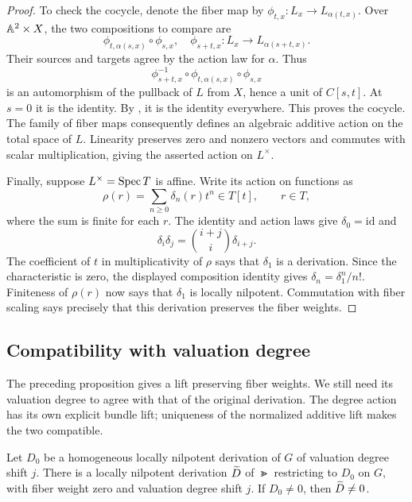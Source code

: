\begin{proof}
To check the cocycle, denote the fiber map by
$\phi_{t,x}\colon L_x\to L_{\alpha(t,x)}$.
Over $\mathbb A^2\times X$, the two compositions to compare are
\[
 \phi_{t,\alpha(s,x)}\circ\phi_{s,x},\quad
 \phi_{s+t,x}
 \colon L_x\longrightarrow L_{\alpha(s+t,x)}.
\]
Their sources and targets agree by the action law for $\alpha$.
Thus
\[
 \phi_{s+t,x}^{-1}\circ
 \phi_{t,\alpha(s,x)}\circ\phi_{s,x}
\]
is an automorphism of the pullback of $L$ from $X$, hence a unit
of $C[s,t]$. At $s=0$ it is the identity. By
, it is the identity everywhere.
This proves the cocycle. The family of fiber maps consequently
defines an algebraic additive action on the total space of $L$.
Linearity preserves zero and nonzero vectors and commutes with
scalar multiplication, giving the asserted action on $L^\times$.

Finally, suppose $L^\times=\operatorname{Spec} T$ is affine. Write its action
on functions as
\[
 \rho(r)=\sum_{n\ge0}\delta_n(r)t^n\in T[t],\qquad r\in T,
\]
where the sum is finite for each $r$. The identity and action laws
give $\delta_0=\mathrm{id}$ and
\[
 \delta_i\delta_j=\binom{i+j}{i}\delta_{i+j}.
\]
The coefficient of $t$ in multiplicativity of $\rho$ says that
$\delta_1$ is a derivation. Since the characteristic is zero, the
displayed composition identity gives
$\delta_n=\delta_1^n/n!$. Finiteness of $\rho(r)$ now says that
$\delta_1$ is locally nilpotent. Commutation with fiber scaling
says precisely that this derivation preserves the fiber weights.
\end{proof}

\subsection{Compatibility with valuation degree}

The preceding proposition gives a lift preserving fiber weights. We
still need its valuation degree to agree with that of the original
derivation. The degree action has its own explicit bundle lift;
uniqueness of the normalized additive lift makes the two compatible.

\begin{proposition}
\label{prop:homogeneous-lift}
Let $D_0$ be a homogeneous locally nilpotent derivation of $G$
of valuation degree shift $j$. There is a locally nilpotent
derivation $\widetilde D$ of $\Gt$ restricting to $D_0$ on $G$, with
fiber weight zero and valuation degree shift $j$. If $D_0\ne0$,
then $\widetilde D\ne0$.
\end{proposition}

